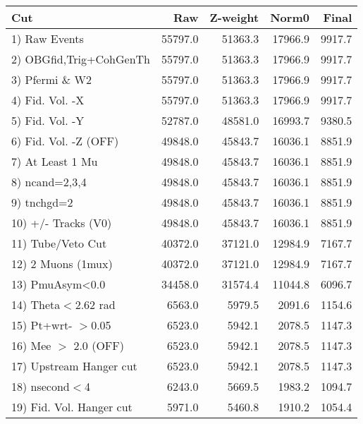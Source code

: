  \begin{table}[h!]\centering
 \begin{tabular}{||l||r|r|r|r||}
 \hline
 \hline
 Cut & Raw & Z-weight & Norm0 & Final \\
 \hline
  1) Raw Events           &     55797.0 &     51363.3 &     17966.9 &      9917.7 \\
  2) OBGfid,Trig+CohGenTh &     55797.0 &     51363.3 &     17966.9 &      9917.7 \\
  3) Pfermi \& W2         &     55797.0 &     51363.3 &     17966.9 &      9917.7 \\
  4) Fid. Vol. -X         &     55797.0 &     51363.3 &     17966.9 &      9917.7 \\
  5) Fid. Vol. -Y         &     52787.0 &     48581.0 &     16993.7 &      9380.5 \\
  6) Fid. Vol. -Z (OFF)   &     49848.0 &     45843.7 &     16036.1 &      8851.9 \\
  7) At Least 1 Mu        &     49848.0 &     45843.7 &     16036.1 &      8851.9 \\
  8) ncand=2,3,4          &     49848.0 &     45843.7 &     16036.1 &      8851.9 \\
  9) tnchgd=2             &     49848.0 &     45843.7 &     16036.1 &      8851.9 \\
 10) +/- Tracks (V0)      &     49848.0 &     45843.7 &     16036.1 &      8851.9 \\
 11) Tube/Veto Cut        &     40372.0 &     37121.0 &     12984.9 &      7167.7 \\
 12) 2 Muons (1mux)       &     40372.0 &     37121.0 &     12984.9 &      7167.7 \\
 13) PmuAsym<0.0          &     34458.0 &     31574.4 &     11044.8 &      6096.7 \\
 14) Theta$<$2.62 rad     &      6563.0 &      5979.5 &      2091.6 &      1154.6 \\
 15) Pt+wrt- $>$0.05      &      6523.0 &      5942.1 &      2078.5 &      1147.3 \\
 16) Mee $>$ 2.0  (OFF)   &      6523.0 &      5942.1 &      2078.5 &      1147.3 \\
 17) Upstream Hanger cut  &      6523.0 &      5942.1 &      2078.5 &      1147.3 \\
 18) nsecond$<$4          &      6243.0 &      5669.5 &      1983.2 &      1094.7 \\
 19) Fid. Vol. Hanger cut &      5971.0 &      5460.8 &      1910.2 &      1054.4 \\

\end{tabular}
\end{table}
